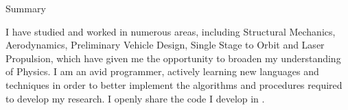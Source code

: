 \begin{cvtext}{Summary}

I have studied and worked in numerous areas, including Structural Mechanics, Aerodynamics, Preliminary Vehicle Design, Single Stage to Orbit and Laser Propulsion, which have given me the opportunity to broaden my understanding of Physics.
I am an avid programmer, actively learning new languages and techniques in order to better implement the algorithms and procedures required to develop my research.
I openly share the code I develop in .

\end{cvtext}
